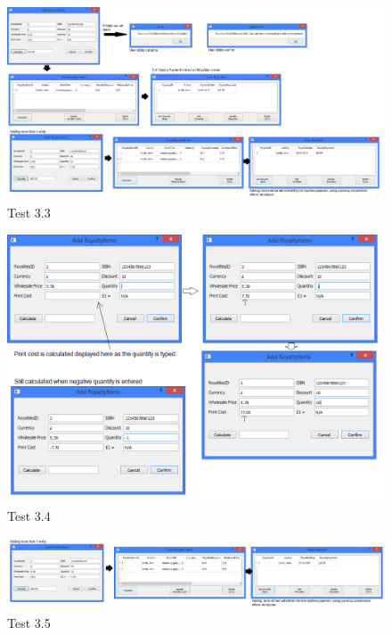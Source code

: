 \begin{landscape}
\begin{figure}[H]
    \includegraphics[width=\textwidth]{./Testing/Evidence/Series3/AddRoyaltyItemTest.png}
    \caption{Test 3.3}  \label{fig:AddRoyaltyItemTest}
\end{figure}

\begin{figure}[H]
    \includegraphics[width=\textwidth]{./Testing/Evidence/Series3/PrintCostValidation.png}
    \caption{Test 3.4}  \label{fig:PrintCostValidation}
\end{figure}

\begin{figure}[H]
    \includegraphics[width=\textwidth]{./Testing/Evidence/Series3/RoyaltyPaymentValidation.png}
    \caption{Test 3.5}  \label{fig:RoyaltyPaymentValidation}
\end{figure}


\end{landscape}
